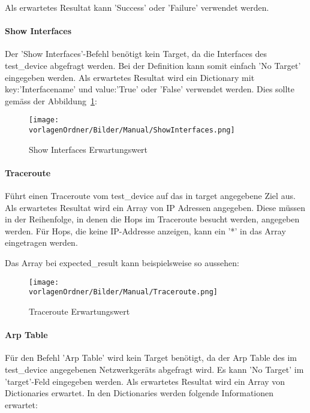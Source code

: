 \documentclass[]{subfiles}
\begin{document}
			Als erwartetes Resultat kann 'Success' oder 'Failure' verwendet werden.

		\paragraph*{Show Interfaces}
			Der 'Show Interfaces'-Befehl benötigt kein Target, da die Interfaces des test\_device
			abgefragt werden. 
			Bei der Definition kann somit einfach 'No Target' eingegeben werden.
			Als erwartetes Resultat wird ein Dictionary mit key:'Interfacename' und 
			value:'True' oder 'False' verwendet werden.
			Dies sollte gemäss der Abbildung~\ref{fig:ShowInterfacesErwarungswert}:

			\begin{figure}[h!]
				\begin{center}
					\texttt{[image: \\vorlagenOrdner/Bilder/Manual/ShowInterfaces.png]}
					\caption{Show Interfaces Erwartungswert}
					\label{fig:ShowInterfacesErwarungswert}
				\end{center}
			\end{figure}

		\paragraph*{Traceroute}
			Führt einen Traceroute vom test\_device auf das in target angegebene Ziel aus.
			Als erwartetes Resultat wird ein Array von IP Adressen angegeben.
			Diese müssen in der Reihenfolge, in denen die Hops im Traceroute besucht werden,
			angegeben werden. Für Hops, die keine IP-Addresse anzeigen, kann ein '*' in das
			Array eingetragen werden.

			Das Array bei expected\_result kann beispielsweise so aussehen:

			\begin{figure}[h!]
				\begin{center}
					\texttt{[image: \\vorlagenOrdner/Bilder/Manual/Traceroute.png]}
					\caption{Traceroute Erwartungswert}
				\end{center}
			\end{figure}

		\paragraph*{Arp Table}
			Für den Befehl 'Arp Table' wird kein Target benötigt, 
			da der Arp Table des im test\_device angegebenen Netzwerkgeräts abgefragt wird. 
			Es kann 'No Target' im 'target'-Feld eingegeben werden.
			Als erwartetes Resultat wird ein Array von Dictionaries erwartet. 
			In den Dictionaries werden folgende Informationen erwartet:
\end{document}

